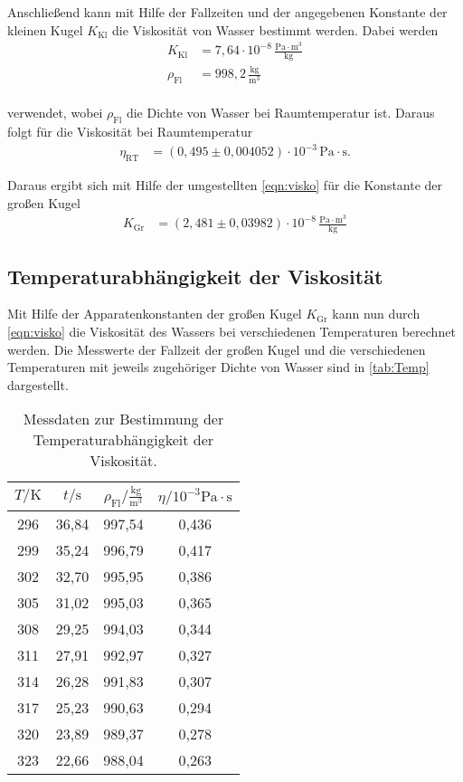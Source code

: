 Anschließend kann mit Hilfe der Fallzeiten und der angegebenen Konstante der kleinen Kugel $K_{\text{Kl}}$ die Viskosität von Wasser bestimmt werden. Dabei werden
\begin{align*}
  K_{\text{Kl}} &= 7,64\cdot 10^{-8} \,\frac{\si{\pascal}\cdot\si{\meter^3}}{\si{\kilogram}} \\
  \rho_{\text{Fl}} &= 998,2\,\frac{\si{\kilogram}}{\si{\meter^3}} \\
\end{align*}

verwendet, wobei $\rho_{\text{Fl}}$ die Dichte von Wasser bei Raumtemperatur ist. Daraus folgt für die Viskosität bei Raumtemperatur
\begin{align*}
  \eta_{\text{RT}} &= (0,495\pm 0,004052 ) \cdot 10^{-3} \,\si{\pascal}\cdot\si{\second}.
\end{align*}

Daraus ergibt sich mit Hilfe der umgestellten \autoref{eqn:visko} für die Konstante der großen Kugel
\begin{align*}
  K_{\text{Gr}} &= (2,481\pm 0,03982) \cdot 10^{-8} \,\frac{\si{\pascal}\cdot\si{\meter^3}}{\si{\kilo\gram}}
\end{align*}



\subsection{Temperaturabhängigkeit der Viskosität}
Mit Hilfe der Apparatenkonstanten der großen Kugel $K_{\text{Gr}}$ kann nun durch \autoref{eqn:visko} die Viskosität des Wassers bei verschiedenen Temperaturen berechnet werden.
Die Messwerte der Fallzeit der großen Kugel und die verschiedenen Temperaturen mit jeweils zugehöriger Dichte von Wasser sind in \autoref{tab:Temp} dargestellt.

\begin{table}[H]
  \centering
  \caption{Messdaten zur Bestimmung der Temperaturabhängigkeit der Viskosität.}
  \label{tab:Temp}
  \begin{tabular}{c c c c}
    \toprule
    $T/\si{\kelvin}$ & $t/\si{\second}$ & $\rho_{\text{Fl}}/\frac{\si{\kilogram}}{\si{\meter^3}}$ & $\eta/10^{-3}\si{\pascal}\cdot \si{\second}$\\
    \midrule
    296 & 36,84 & 997,54 & 0,436 \\
    299 & 35,24 & 996,79 & 0,417 \\
    302 & 32,70 & 995,95 & 0,386 \\
    305 & 31,02 & 995,03 & 0,365 \\
    308 & 29,25 & 994,03 & 0,344 \\
    311 & 27,91 & 992,97 & 0,327 \\
    314 & 26,28 & 991,83 & 0,307 \\
    317 & 25,23 & 990,63 & 0,294 \\
    320 & 23,89 & 989,37 & 0,278 \\
    323 & 22,66 & 988,04 & 0,263 \\
    \bottomrule
  \end{tabular}
\end{table}

